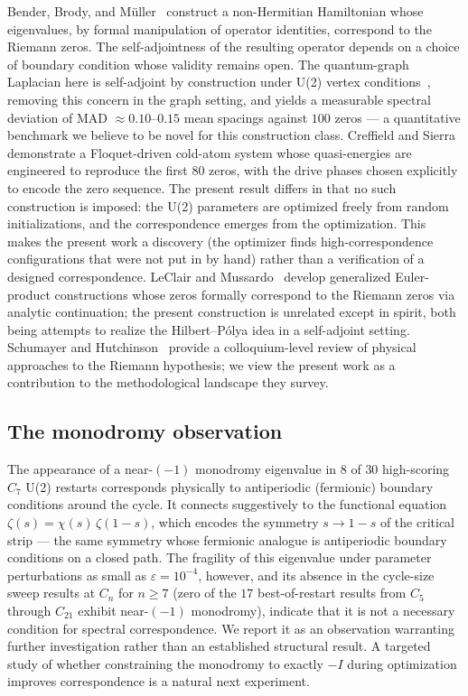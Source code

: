 \documentclass[cntp]{ipart}
\theoremstyle{plain}
\theoremstyle{remark}
\begin{document}
Bender, Brody, and M\"uller~\cite{r12} construct a non-Hermitian Hamiltonian whose eigenvalues, by formal manipulation of operator identities, correspond to the Riemann zeros. The self-adjointness of the resulting operator depends on a choice of boundary condition whose validity remains open. The quantum-graph Laplacian here is self-adjoint by construction under U(2) vertex conditions~\cite{r3}, removing this concern in the graph setting, and yields a measurable spectral deviation of MAD $\approx 0.10$--$0.15$ mean spacings against $100$ zeros --- a quantitative benchmark we believe to be novel for this construction class. Creffield and Sierra~\cite{r13} demonstrate a Floquet-driven cold-atom system whose quasi-energies are engineered to reproduce the first $80$ zeros, with the drive phases chosen explicitly to encode the zero sequence. The present result differs in that no such construction is imposed: the U(2) parameters are optimized freely from random initializations, and the correspondence emerges from the optimization. This makes the present work a discovery (the optimizer finds high-correspondence configurations that were not put in by hand) rather than a verification of a designed correspondence. LeClair and Mussardo~\cite{r6} develop generalized Euler-product constructions whose zeros formally correspond to the Riemann zeros via analytic continuation; the present construction is unrelated except in spirit, both being attempts to realize the Hilbert--P\'olya idea in a self-adjoint setting. Schumayer and Hutchinson~\cite{r8} provide a colloquium-level review of physical approaches to the Riemann hypothesis; we view the present work as a contribution to the methodological landscape they survey.

\subsection{The monodromy observation}
\label{sec:disc-monodromy}

The appearance of a near-$(-1)$ monodromy eigenvalue in $8$ of $30$ high-scoring $C_7$ U(2) restarts corresponds physically to antiperiodic (fermionic) boundary conditions around the cycle. It connects suggestively to the functional equation $\zeta(s) = \chi(s)\,\zeta(1-s)$, which encodes the symmetry $s \to 1 - s$ of the critical strip --- the same symmetry whose fermionic analogue is antiperiodic boundary conditions on a closed path. The fragility of this eigenvalue under parameter perturbations as small as $\varepsilon = 10^{-4}$, however, and its absence in the cycle-size sweep results at $C_n$ for $n \geq 7$ (zero of the $17$ best-of-restart results from $C_5$ through $C_{21}$ exhibit near-$(-1)$ monodromy), indicate that it is not a necessary condition for spectral correspondence. We report it as an observation warranting further investigation rather than an established structural result. A targeted study of whether constraining the monodromy to exactly $-I$ during optimization improves correspondence is a natural next experiment.
\end{document}
